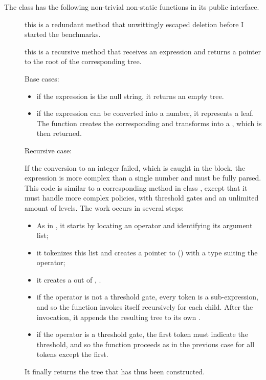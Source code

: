 \documentclass{article}
\begin{document}
The class has the following non-trivial non-static functions in its public interface.
\begin{description}
\item[] this is a redundant method that unwittingly escaped deletion before I started the benchmarks.

\item[] this is a recursive method that receives an expression and returns a pointer to the root of the corresponding tree. 

Base cases:
\begin{itemize}
\item if the expression is the null string, it returns an empty tree.
\item if the expression can be converted into a number, it represents a leaf. The function creates the corresponding \cnode and transforms into a \ctree, which is then returned.
\end{itemize}

Recursive case:

If the conversion to an integer failed, which is caught in the  block, the expression is more complex than a single number and must be fully parsed. This code is similar to a corresponding method in class \cBLcanonAP, except that it must handle more complex policies, with threshold gates and an unlimited amount of levels. The work occurs in several steps:
\begin{itemize}
\item As in \cBLcanonAP, it starts by locating an operator and identifying its argument list;
\item it tokenizes this list and creates a pointer to \cnode () with a type suiting the operator;
\item it creates a \ctree out of , .
\item if the operator is not a threshold gate, every token is a sub-expression, and so the function invokes itself recursively for each child. After the invocation, it appends the resulting tree to its own .
\item if the operator is a threshold gate, the first token must indicate the threshold, and so the function proceeds as in the previous case for all tokens except the first.
\end{itemize}

It finally returns the tree that has thus been constructed.
 

\end{description}
\end{document}
